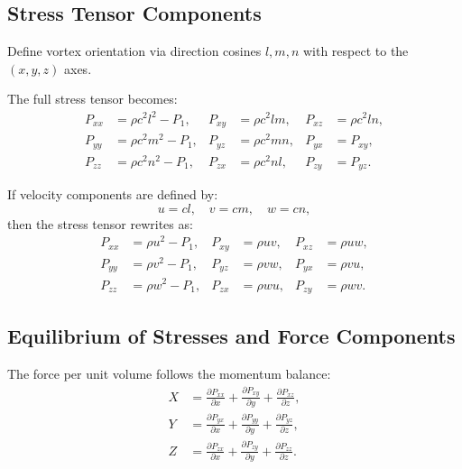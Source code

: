 \documentclass[12pt]{article}
\begin{document}
    \subsection*{Stress Tensor Components}
    Define vortex orientation via direction cosines \(l, m, n\) with respect to the \((x, y, z)\) axes.

    The full stress tensor becomes:
    \begin{align}
        P_{xx} &= \rho c^2 l^2 - P_1, & P_{xy} &= \rho c^2 l m, & P_{xz} &= \rho c^2 l n, \\
        P_{yy} &= \rho c^2 m^2 - P_1, & P_{yz} &= \rho c^2 m n, & P_{yx} &= P_{xy}, \\
        P_{zz} &= \rho c^2 n^2 - P_1, & P_{zx} &= \rho c^2 n l, & P_{zy} &= P_{yz}.
    \end{align}

    If velocity components are defined by:
    \begin{equation}
        u = c l, \quad v = c m, \quad w = c n,
    \end{equation}
    then the stress tensor rewrites as:
    \begin{align}
        P_{xx} &= \rho u^2 - P_1, & P_{xy} &= \rho u v, & P_{xz} &= \rho u w, \\
        P_{yy} &= \rho v^2 - P_1, & P_{yz} &= \rho v w, & P_{yx} &= \rho v u, \\
        P_{zz} &= \rho w^2 - P_1, & P_{zx} &= \rho w u, & P_{zy} &= \rho w v.
    \end{align}

    \subsection*{Equilibrium of Stresses and Force Components}
    The force per unit volume follows the momentum balance:
    \begin{align}
        X &= \frac{\partial P_{xx}}{\partial x} + \frac{\partial P_{xy}}{\partial y} + \frac{\partial P_{xz}}{\partial z}, \\
        Y &= \frac{\partial P_{yx}}{\partial x} + \frac{\partial P_{yy}}{\partial y} + \frac{\partial P_{yz}}{\partial z}, \\
        Z &= \frac{\partial P_{zx}}{\partial x} + \frac{\partial P_{zy}}{\partial y} + \frac{\partial P_{zz}}{\partial z}.
    \end{align}
\end{document}
